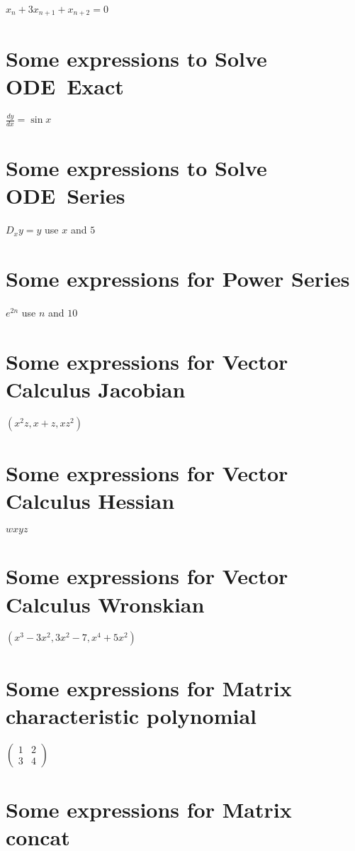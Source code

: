 \documentclass{article}
\begin{document}
$x_{n}+3x_{n+1}+x_{n+2}=0$

\section{Some expressions to Solve ODE\ Exact}

$\frac{dy}{dx}=\sin x$

\section{Some expressions to Solve ODE\ Series}

$D_{x}y=y$ use $x$ and $5$

\section{Some expressions for Power Series}

$e^{2n}$ use $n$ and $10$

\section{Some expressions for Vector Calculus Jacobian}

$(x^{2}z,x+z,xz^{2})$

\section{Some expressions for Vector Calculus Hessian}

$wxyz$

\section{Some expressions for Vector Calculus Wronskian}

$\left( x^{3}-3x^{2},3x^{2}-7,x^{4}+5x^{2}\right) $

\section{Some expressions for Matrix characteristic polynomial}

$\left( 
\begin{array}{cc}
1 & 2 \\ 
3 & 4%
\end{array}%
\right) $

\section{Some expressions for Matrix concat}
\end{document}
